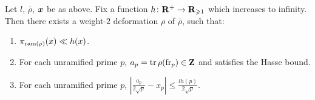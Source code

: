 \begin{theorem}\label{thm:master-Galois}
Let $l$, $\bar\rho$, ${\boldsymbol x}$ be as above. Fix a function 
$h\colon \mathbf{R}^+ \to \mathbf{R}_{\geqslant 1}$ which increases to infinity. Then there 
exists a weight-$2$ deformation $\rho$ of $\bar\rho$, such that: 
\begin{enumerate}
\item
$\pi_{\mathrm{ram}(\rho)}(x) \ll h(x)$. 

\item
For each unramified prime $p$, $a_p=\operatorname{tr}\rho(\mathrm{fr}_p)\in \mathbf{Z}$ and satisfies the 
Hasse bound. 

\item
For each unramified prime $p$, 
$\left| \frac{a_p}{2\sqrt p} - x_p\right| \leqslant \frac{l h(p)}{2\sqrt p}$. 
\end{enumerate}
\end{theorem}
